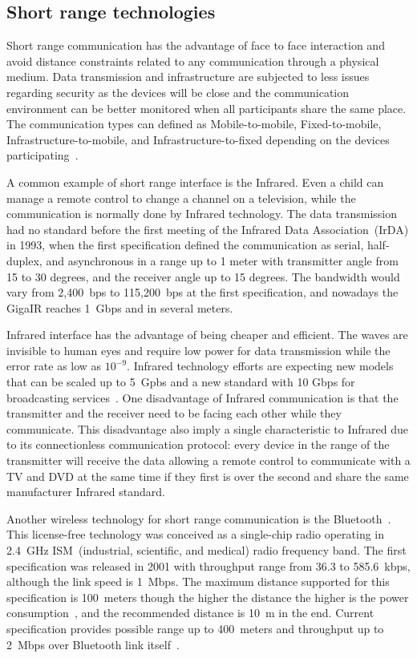 \subsection*{Short range technologies} 

Short range communication has the advantage of face to face interaction and avoid distance constraints related to any communication through a physical medium.
Data transmission and infrastructure are subjected to less issues regarding security as the devices will be close and the communication environment can be better monitored when all participants share the same place.
The communication types can defined as Mobile-to-mobile, Fixed-to-mobile, Infrastructure-to-mobile, and Infrastructure-to-fixed depending on the devices participating~\citep{Deicke201optical}.

A common example of short range interface is the Infrared.
Even a child can manage a remote control to change a channel on a television, while the communication is normally done by Infrared technology.
The data transmission had no standard before the first meeting of the Infrared Data Association~(IrDA) in 1993, when the first specification defined the communication as serial, half-duplex, and asynchronous in a range up to 1 meter with transmitter angle from 15 to 30 degrees, and the receiver angle up to 15 degrees.
The bandwidth would vary from 2,400~bps to 115,200~bps at the first specification, and nowadays the GigaIR reaches 1~Gbps and in several meters.

Infrared interface has the advantage of being cheaper and efficient.
The waves are invisible to human eyes and require low power for data transmission while the error rate as low as $10^{-9}$.
Infrared technology efforts are expecting new models that can be scaled up to 5~Gpbs and a new standard with 10 Gbps for broadcasting services~\citep{Deicke201optical}.
One disadvantage of Infrared communication is that the transmitter and the receiver need to be facing each other while they communicate.
This disadvantage also imply a single characteristic to Infrared due to its connectionless communication protocol: every device in the range of the transmitter will receive the data allowing a remote control to communicate with a TV and DVD at the same time if they first is over the second and share the same manufacturer Infrared standard.

Another wireless technology for short range communication is the Bluetooth~\citep{Bhagwat2001bluetooth}.
This license-free technology was conceived as a single-chip radio operating in 2.4~GHz ISM~(industrial, scientific, and medical) radio frequency band.
The first specification was released in 2001 with throughput range from 36.3 to 585.6~kbps, although the link speed is 1~Mbps.
The maximum distance supported for this specification is 100~meters though the higher the distance the higher is the power consumption~\citep[p.~20]{Gupta2013insidebluetooth}, and the recommended distance is 10~m in the end.
Current specification provides possible range up to 400~meters and throughput up to 2~Mbps over Bluetooth link itself~\citep{Bluetooth2016bluetooth}.

